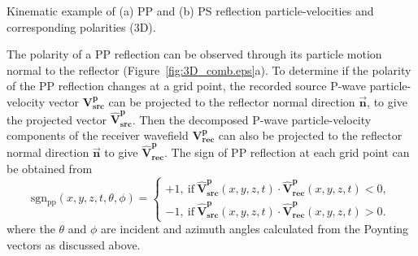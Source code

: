 \documentclass[manuscript,ulem,graphix,revised]{geophysics}
\begin{document}
{
Kinematic example of (a) PP and (b) PS reflection particle-velocities and corresponding polarities (3D). 
}

The polarity of a PP reflection can be observed through its particle motion normal to the reflector (Figure~\ref{fig:3D_comb.eps}a). To determine if the polarity of the PP reflection changes at a grid point, 
the recorded source P-wave particle-velocity vector $\mathbf{V}^{\mathbf{p}}_{\mathbf{src}}$ can be projected to the reflector normal direction $\overrightarrow{\mathbf{n}}$, to give the projected vector $\hat{\mathbf{V}}^{\mathbf{p}}_{\mathbf{src}}$. Then 
the decomposed P-wave particle-velocity components of the receiver wavefield $\mathbf{V}^{\mathbf{p}}_{\mathbf{rec}}$ can also be projected to the reflector normal direction $\overrightarrow{\mathbf{n}}$ to give $\hat{\mathbf{V}}^{\mathbf{p}}_{\mathbf{rec}}$. The sign of PP reflection at each grid point can be obtained from
\begin{equation}
\mathrm{sgn_{pp}}(x,y,z,t,\theta, \phi)=\begin{cases}
 +1, \ \mathrm{if} \  \hat{\mathbf{V}}^{\mathbf{p}}_{\mathbf{src}}(x,y,z,t) \cdot \hat{\mathbf{V}}^{\mathbf{p}}_{\mathbf{rec}}(x,y,z,t)<0 , \\
 -1, \ \mathrm{if}  \ \hat{\mathbf{V}}^{\mathbf{p}}_{\mathbf{src}}(x,y,z,t) \cdot \hat{\mathbf{V}}^{\mathbf{p}}_{\mathbf{rec}}(x,y,z,t)>0 .
\end{cases}
\label{eqn:sgn_pp}
\end{equation}
where the $\theta$ and $\phi$ are incident and azimuth angles calculated from the Poynting vectors as discussed above.
\end{document}
